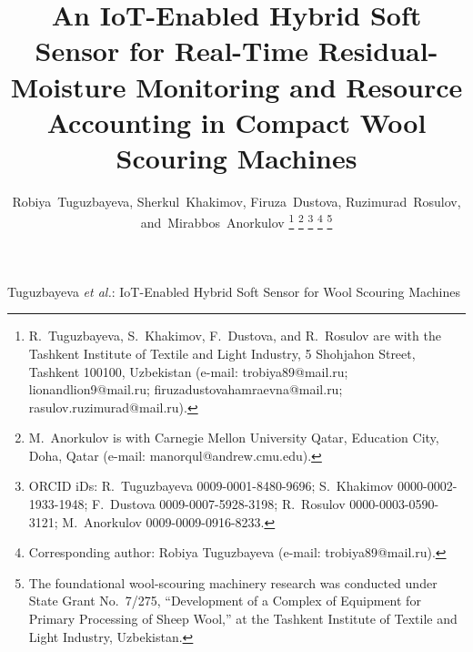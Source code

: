 \documentclass[journal]{IEEEtran}
\begin{document}
\title{An IoT-Enabled Hybrid Soft Sensor for Real-Time Residual-Moisture Monitoring and Resource Accounting in Compact Wool Scouring Machines}

\author{Robiya~Tuguzbayeva,
        Sherkul~Khakimov,
        Firuza~Dustova,
        Ruzimurad~Rosulov,
        and~Mirabbos~Anorkulov%
\thanks{R.~Tuguzbayeva, S.~Khakimov, F.~Dustova, and R.~Rosulov are with the Tashkent Institute of Textile and
Light Industry, 5 Shohjahon Street, Tashkent 100100, Uzbekistan (e-mail: trobiya89@mail.ru;
lionandlion9@mail.ru; firuzadustovahamraevna@mail.ru; rasulov.ruzimurad@mail.ru).}%
\thanks{M.~Anorkulov is with Carnegie Mellon University Qatar, Education City, Doha, Qatar
(e-mail: manorqul@andrew.cmu.edu).}%
\thanks{ORCID iDs: R.~Tuguzbayeva 0009-0001-8480-9696;
S.~Khakimov 0000-0002-1933-1948;
F.~Dustova 0009-0007-5928-3198;
R.~Rosulov 0000-0003-0590-3121;
M.~Anorkulov 0009-0009-0916-8233.}%
\thanks{Corresponding author: Robiya Tuguzbayeva (e-mail: trobiya89@mail.ru).}%
\thanks{The foundational wool-scouring machinery research was conducted under State Grant No.~7/275,
``Development of a Complex of Equipment for Primary Processing of Sheep Wool,'' at the Tashkent Institute of
Textile and Light Industry, Uzbekistan.}}

%
{Tuguzbayeva \MakeLowercase{\textit{et al.}}: IoT-Enabled Hybrid Soft Sensor for Wool Scouring Machines}

\maketitle
\end{document}
